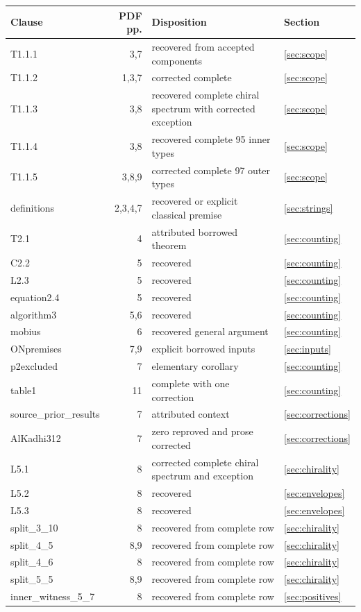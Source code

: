\small
\begin{longtable}{p{}rp{}l}
\toprule Clause&PDF pp.&Disposition&Section\\\midrule\endhead
T1.1.1&3,7&recovered from accepted components&\ref{sec:scope}\\
T1.1.2&1,3,7&corrected complete&\ref{sec:scope}\\
T1.1.3&3,8&recovered complete chiral spectrum with corrected exception&\ref{sec:scope}\\
T1.1.4&3,8&recovered complete 95 inner types&\ref{sec:scope}\\
T1.1.5&3,8,9&corrected complete 97 outer types&\ref{sec:scope}\\
definitions&2,3,4,7&recovered or explicit classical premise&\ref{sec:strings}\\
T2.1&4&attributed borrowed theorem&\ref{sec:counting}\\
C2.2&5&recovered&\ref{sec:counting}\\
L2.3&5&recovered&\ref{sec:counting}\\
equation2.4&5&recovered&\ref{sec:counting}\\
algorithm3&5,6&recovered&\ref{sec:counting}\\
mobius&6&recovered general argument&\ref{sec:counting}\\
ONpremises&7,9&explicit borrowed inputs&\ref{sec:inputs}\\
p2excluded&7&elementary corollary&\ref{sec:counting}\\
table1&11&complete with one correction&\ref{sec:counting}\\
source\_prior\_results&7&attributed context&\ref{sec:corrections}\\
AlKadhi312&7&zero reproved and prose corrected&\ref{sec:corrections}\\
L5.1&8&corrected complete chiral spectrum and exception&\ref{sec:chirality}\\
L5.2&8&recovered&\ref{sec:envelopes}\\
L5.3&8&recovered&\ref{sec:envelopes}\\
split\_3\_10&8&recovered from complete row&\ref{sec:chirality}\\
split\_4\_5&8,9&recovered from complete row&\ref{sec:chirality}\\
split\_4\_6&8&recovered from complete row&\ref{sec:chirality}\\
split\_5\_5&8,9&recovered from complete row&\ref{sec:chirality}\\
inner\_witness\_5\_7&8&recovered from complete row&\ref{sec:positives}\\

\end{longtable}

